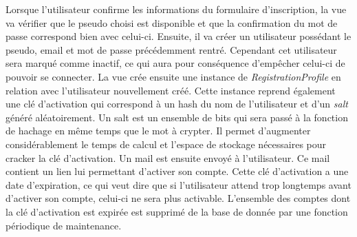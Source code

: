\documentclass[12pt, a4paper, oneside]{article}
\begin{document}
    \indent Lorsque l'utilisateur confirme les informations du formulaire d'inscription, la vue va vérifier que le pseudo choisi est disponible et que la confirmation du mot de passe correspond bien avec celui-ci. Ensuite, il va créer un utilisateur possédant le pseudo, email et mot de passe précédemment rentré. Cependant cet utilisateur sera marqué comme inactif, ce qui aura pour conséquence d'empêcher celui-ci de pouvoir se connecter. La vue crée ensuite une instance de \textit{RegistrationProfile} en relation avec l'utilisateur nouvellement créé. Cette instance reprend également une clé d'activation qui correspond à un hash du nom de l'utilisateur et d'un \textit{salt} généré aléatoirement. Un salt est un ensemble de bits qui sera passé à la fonction de hachage en même temps que le mot à crypter. Il permet d'augmenter considérablement le temps de calcul et l'espace de stockage nécessaires pour cracker la clé d'activation. Un mail est ensuite envoyé à l'utilisateur. Ce mail contient un lien lui permettant d'activer son compte. Cette clé d'activation a une date d'expiration, ce qui veut dire que si l'utilisateur attend trop longtemps avant d'activer son compte, celui-ci ne sera plus activable. L'ensemble des comptes dont la clé d'activation est expirée est supprimé de la base de donnée par une fonction périodique de maintenance.\\

\end{document}
